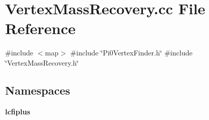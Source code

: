 \section{Vertex\+Mass\+Recovery.\+cc File Reference}
\label{VertexMassRecovery_8cc}
{\ttfamily \#include $<$map$>$}\newline
{\ttfamily \#include \char`\"{}Pi0\+Vertex\+Finder.\+h\char`\"{}}\newline
{\ttfamily \#include \char`\"{}Vertex\+Mass\+Recovery.\+h\char`\"{}}\newline
\subsection*{Namespaces}
\begin{DoxyCompactItemize}
\item 
 \textbf{ lcfiplus}
\end{DoxyCompactItemize}
